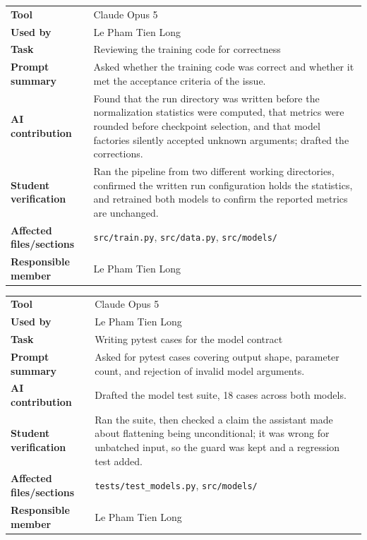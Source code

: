 \noindent\begin{minipage}{\textwidth}
\begin{tabularx}{\textwidth}{lX}
\hline
\textbf{Tool} & Claude Opus 5 \\
\textbf{Used by} & Le Pham Tien Long \\
\textbf{Task} & Reviewing the training code for correctness \\
\textbf{Prompt summary} & Asked whether the training code was correct and whether it met the acceptance criteria of the issue. \\
\textbf{AI contribution} & Found that the run directory was written before the normalization statistics were computed, that metrics were rounded before checkpoint selection, and that model factories silently accepted unknown arguments; drafted the corrections. \\
\textbf{Student verification} & Ran the pipeline from two different working directories, confirmed the written run configuration holds the statistics, and retrained both models to confirm the reported metrics are unchanged. \\
\textbf{Affected files/sections} & \texttt{src/train.py}, \texttt{src/data.py}, \texttt{src/models/} \\
\textbf{Responsible member} & Le Pham Tien Long \\
\hline
\end{tabularx}
\end{minipage}

\noindent\begin{minipage}{\textwidth}
\begin{tabularx}{\textwidth}{lX}
\hline
\textbf{Tool} & Claude Opus 5 \\
\textbf{Used by} & Le Pham Tien Long \\
\textbf{Task} & Writing pytest cases for the model contract \\
\textbf{Prompt summary} & Asked for pytest cases covering output shape, parameter count, and rejection of invalid model arguments. \\
\textbf{AI contribution} & Drafted the model test suite, 18 cases across both models. \\
\textbf{Student verification} & Ran the suite, then checked a claim the assistant made about flattening being unconditional; it was wrong for unbatched input, so the guard was kept and a regression test added. \\
\textbf{Affected files/sections} & \texttt{tests/test\_models.py}, \texttt{src/models/} \\
\textbf{Responsible member} & Le Pham Tien Long \\
\hline
\end{tabularx}
\end{minipage}

